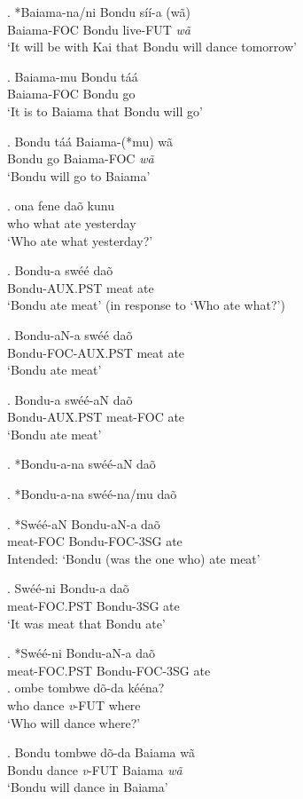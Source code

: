 \documentclass{assets/fieldnotes}
\begin{document}
\ex. *Baiama-na/ni Bondu síí-a (wã)\\
Baiama-FOC Bondu live-FUT \textit{wã}\\
`It will be with Kai that Bondu will dance tomorrow'

\ex. Baiama-mu Bondu táá\\
Baiama-FOC Bondu go\\
`It is to Baiama that Bondu will go'

\ex. Bondu táá Baiama-(*mu) wã\\
Bondu go Baiama-FOC \textit{wã}\\
`Bondu will go to Baiama'

\exg. \textipa{\textltailn}ona fene daõ kunu\\
who what ate yesterday\\
`Who ate what yesterday?'

\exg. Bondu-a swéé daõ\\
Bondu-AUX.PST meat ate\\
`Bondu ate meat' (in response to `Who ate what?')

\exg. Bondu-aN-a swéé daõ\\
Bondu-FOC-AUX.PST meat ate\\
`Bondu ate meat'

\exg. Bondu-a swéé-aN daõ\\
Bondu-AUX.PST meat-FOC ate\\
`Bondu ate meat'

\ex. *Bondu-a-na swéé-aN daõ

\ex. *Bondu-a-na swéé-na/mu daõ

\exg. *Swéé-aN Bondu-aN-a daõ\\
meat-FOC Bondu-FOC-3SG ate\\
Intended: `Bondu (was the one who) ate meat'

\ex. Swéé-ni Bondu-a daõ\\
meat-FOC.PST Bondu-3SG ate\\
`It was meat that Bondu ate'

\exg. *Swéé-ni Bondu-aN-a daõ\\
meat-FOC.PST Bondu-FOC-3SG ate\\

\exg. \textipa{\textltailn}ombe tombwe dõ-da kééna?\\
who dance \textit{v}-FUT where\\
`Who will dance where?'

\exg. Bondu tombwe dõ-da Baiama wã\\
Bondu dance \textit{v}-FUT Baiama \textit{wã}\\
`Bondu will dance in Baiama'
\end{document}
